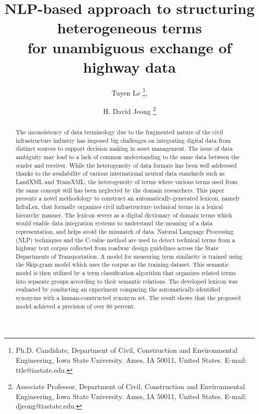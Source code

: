 \documentclass[Journal,InsideFigs, DoubleSpace]{ascelike} %
\begin{document}
\title{NLP-based approach to structuring heterogeneous terms \\for unambiguous exchange of highway data}


%
\author{
Tuyen Le
\thanks{
Ph.D. Candidate, Department of Civil, Construction and Environmental Engineering, Iowa State University. Ames, IA 50011, United States. E-mail: ttle@iastate.edu.},
\and
H. David Jeong
\thanks{Associate Professor, Department of Civil, Construction and Environmental Engineering, Iowa State University. Ames, IA 50011, United States. E-mail: djeong@iastate.edu.}
 }

\maketitle
%

\begin{abstract} %
The inconsistency of data terminology due to the fragmented nature of the civil infrastructure industry has imposed big challenges on integrating digital data from distinct sources to support decision making in asset management. The issue of data ambiguity may lead to a lack of common understanding to the same data between the sender and receiver. While the heterogeneity of data formats has been well addressed thanks to the availability of various international neutral data standards such as LandXML and TransXML;  the heterogeneity of terms where various terms used from the same concept still has been neglected by the domain researchers. 
This paper presents a novel methodology to construct an automatically-generated lexicon, namely InfraLex, that formally organizes civil infrastructure technical terms in a lexical hierarchy manner. The lexicon severs as a digital dictionary of domain terms which would enable data integration systems to understand the meaning of a data representation, and helps avoid the mismatch of data.
Natural Language Processing (NLP) techniques and the C-value method are used to detect technical terms from a highway text corpus collected from roadway design guidelines across the State Departments of Transportation. A model for measuring term similarity is trained using the Skip-gram model which uses the corpus as the training dataset. This semantic model is then utilized by a term classification algorithm that organizes related terms into separate groups according to their semantic relations.
The developed lexicon was evaluated by conducting an experiment comparing the automatically-identified synonyms with a human-constructed synonym set. The result shows that the proposed model achieved a precision of over 80 percent.
  
\end{abstract}
\end{document}
